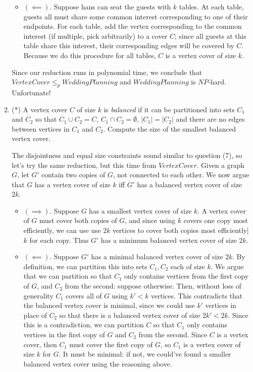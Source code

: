 \documentclass[fleqn]{article}
\begin{document}
\begin{enumerate}
\begin{answer}
\begin{itemize}
            \item $(\impliedby)$. Suppose hans can seat the guests with $k$ tables. At each table, guests all must share some common interest corresponding to one of their endpoints. For each table, add the vertex corresponding to the common interest (if multiple, pick arbitrarily) to a cover $C$; since all guests at this table share this interest, their corresponding edges will be covered by $C$. Because we do this procedure for all tables, $C$ is a vertex cover of size $k$.
        \end{itemize}
        Since our reduction runs in polynomial time, we conclude that $VertexCover \leq_p WeddingPlanning$ and $WeddingPlanning$ is $NP$-hard. Unfortunate!
    \end{answer}
    \item (*) A vertex cover $C$ of size $k$ is \textit{balanced} if it can be partitioned into sets $C_1$ and $C_2$ so that $C_1 \cup C_2 = C$, $C_1 \cap C_2 = \emptyset$, $|C_1| = |C_2|$ and there are no edges between vertices in $C_1$ and $C_2$. Compute the size of the smallest balanced vertex cover.
    \begin{answer}
        The disjointness and equal size constraints sound similar to question (7), so let's try the same reduction, but this time from $VertexCover$. Given a graph $G$, let $G'$ contain two copies of $G$, not connected to each other. We now argue that $G$ has a vertex cover of size $k$ iff $G'$ has a balanced vertex cover of size $2k$.
        \begin{itemize}
            \item $(\implies)$. Suppose $G$ has a smallest vertex cover of size $k$. A vertex cover of $G$ must cover both copies of $G$, and since using $k$ covers one copy most efficiently, we can use use $2k$ vertices to cover both copies most efficiently|$k$ for each copy. Thus $G'$ has a minimum balanced vertex cover of size $2k$.
            \item $(\impliedby)$. Suppose $G'$ has a minimal balanced vertex cover of size $2k$. By definition, we can partition this into sets $C_1, C_2$ each of size $k$. We argue that we can partition so that $C_1$ only contains vertices from the first copy of $G$, and $C_2$ from the second: suppose otherwise. Then, without loss of generality $C_1$ covers all of $G$ using $k' < k$ vertices. This contradicts that the balanced vertex cover is minimal, since we could use $k'$ vertices in place of $C_2$ so that there is a balanced vertex cover of size $2k' < 2k$. Since this is a contradiction, we can partition $C$ so that $C_1$ only contains vertices in the first copy of $G$ and $C_2$ from the second. Since $C$ is a vertex cover, then $C_1$ must cover the first copy of $G$, so $C_1$ is a vertex cover of size $k$ for $G$. It must be minimal: if not, we could've found a smaller balanced vertex cover using the reasoning above.

\end{itemize}
\end{answer}
\end{enumerate}
\end{document}
